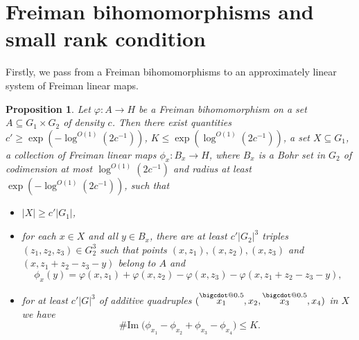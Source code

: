 \documentclass[a4paper,11pt]{article}
\makeatletter
\numberwithin{theorem}{section}
\newtheorem{proposition}[theorem]{Proposition}
\theoremstyle{definition}
\newcommand{\on}[1]{
	\operatorname{#1}
}
\newcommand\range{\on{\# Im}}
\newcommand*\bcdot{\mathpalette\bigcdot@{0.5}}
\newcommand*\bigcdot@[2]{\mathbin{\vcenter{\hbox{\scalebox{#2}{$\m@th#1\bullet$}}}}}
\newcommand{\upd}[1]{\overset{\bcdot}{#1}}
\makeatother
\begin{document}
\section{Freiman bihomomorphisms and small rank condition}\label{fbihomsmallranksection}

Firstly, we pass from a Freiman bihomomorphisms to an approximately linear system of Freiman linear maps.

\begin{proposition}\label{freimanbihomomStep1passtolineaersystem}
    Let $\varphi : A \to H$ be a Freiman bihomomorphism on a set $A \subseteq G_1 \times G_2$ of density $c$. Then there exist quantities $c' \geq \exp(-\log^{O(1)} (2c^{-1})) $, $K \leq \exp(\log^{O(1)} (2c^{-1}))$, a set $X \subseteq G_1$, a collection of Freiman linear maps $\phi_x : B_x \to H$, where $B_x$ is a Bohr set in $G_2$ of codimension at most $\log^{O(1)} (2c^{-1})$ and radius at least $\exp(-\log^{O(1)} (2c^{-1}))$, such that
    \begin{itemize}
        \item[\textbf{(i)}] $|X| \geq c' |G_1|$,
        \item[\textbf{(ii)}] for each $x \in X$ and all $y \in B_x$, there are at least $c'|G_2|^3$ triples $(z_1, z_2, z_3) \in G_2^3$ such that points $(x, z_1), (x, z_2), (x, z_3)$ and $(x, z_1 + z_2 - z_3 - y)$ belong to $A$ and
        \[\phi_x(y) = \varphi(x, z_1) + \varphi(x, z_2) - \varphi(x, z_3) - \varphi(x, z_1 + z_2 - z_3 - y),\]
        \item[\textbf{(iii)}] for at least $c' |G|^3$ of additive quadruples $(\upd{x_1}, x_2, \upd{x_3}, x_4)$ in $X$ we have
        \[\range\Big(\phi_{x_1} - \phi_{x_2} + \phi_{x_3} - \phi_{x_4}\Big) \leq K.\]
    \end{itemize}
\end{proposition}
\end{document}
